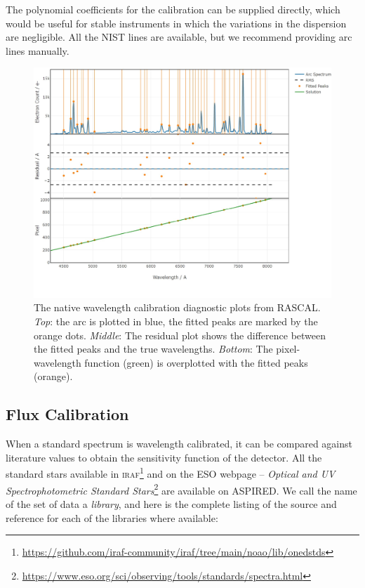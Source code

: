 \documentclass[linenumbers, twocolumn]{aastex631}
\begin{document}
The polynomial coefficients for the calibration can be supplied
directly, which would be useful for stable instruments in which
the variations in the dispersion are negligible. All the NIST lines
are available, but we recommend providing arc lines manually.

\begin{figure}
    \centering
    \includegraphics[width=\columnwidth]{fig_05_wavelength_calibration_diagnostics.pdf}
    \caption{The native wavelength calibration diagnostic plots from RASCAL.
    \textit{Top}: the arc is plotted in blue, the fitted peaks are marked by
    the orange dots. \textit{Middle}: The residual plot shows the difference
    between the fitted peaks and the true wavelengths. \textit{Bottom}: The
    pixel-wavelength function (green) is overplotted with the fitted
    peaks (orange).}
    \label{fig:wavecal}
\end{figure}

\subsection{Flux Calibration}
When a standard spectrum is wavelength calibrated, it can be
compared against literature values to obtain the sensitivity
function of the detector. All the standard stars available in
\textsc{iraf}\footnote{\url{https://github.com/iraf-community/iraf/tree/main/noao/lib/onedstds}}
and on the ESO webpage -- \textit{Optical and UV Spectrophotometric
Standard Stars}\footnote{\url{https://www.eso.org/sci/observing/tools/standards/spectra.html}}
are available on \textsc{ASPIRED}. We call the name of the set of data a
\textit{library}, and here is the complete listing of the source and reference
for each of the libraries where available:
\end{document}
